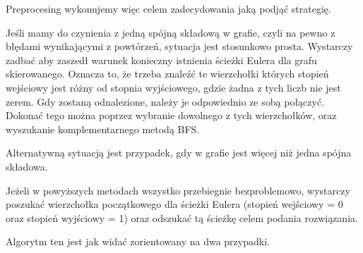 \documentclass[a4paper]{article}
\begin{document}
Preprocesing wykonujemy więc celem zadecydowania jaką podjąć strategię.

Jeśli mamy do czynienia z jedną spójną składową w grafie, czyli na pewno z błędami wynikającymi z powtórzeń, sytuacja jest
stosunkowo prosta. Wystarczy zadbać aby zaszedł warunek konieczny istnienia ścieżki Eulera dla grafu skierowanego. 
Oznacza to, że trzeba znaleźć te wierzchołki których stopień wejściowy jest różny od stopnia wyjściowego, gdzie żadna
z tych liczb nie jest zerem. Gdy zostaną odnalezione, należy je odpowiednio ze sobą połączyć. Dokonać tego można poprzez
wybranie dowolnego z tych wierzchołków, oraz wyszukanie komplementarnego metodą BFS.

Alternatywną sytuacją jest przypadek, gdy w grafie jest więcej niż jedna spójna składowa. %

Jeżeli w powyższych metodach wszystko przebiegnie bezproblemowo, wystarczy poszukać wierzchołka początkowego dla ścieżki
Eulera (stopień wejściowy = 0 oraz stopień wyjściowy = 1) oraz odszukać tą ścieżkę celem podania rozwiązania.

Algorytm ten jest jak widać zorientowany na dwa przypadki. %
\end{document}
